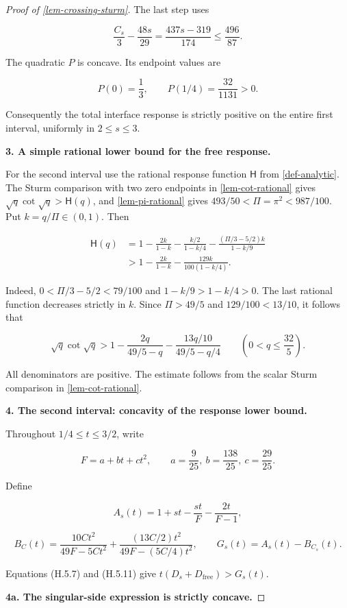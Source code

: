 \documentclass[11pt,a4paper]{article}
\theoremstyle{proofmanuscript}
\begin{document}
\begin{proof}[Proof of \ref{lem-crossing-sturm}]
The last step uses

\[
\frac{C_s}{3}-\frac{48s}{29}
=\frac{437s-319}{174}\le\frac{496}{87}.
\]

The quadratic \(P\) is concave. Its endpoint values are

\[
P(0)=\frac13,\qquad P(1/4)=\frac{32}{1131}>0.
\]

Consequently the total interface response is strictly positive on the entire first interval, uniformly in \(2\le s\le3\).

\textbf{3. A simple rational lower bound for the free response.}

For the second interval use the rational response function \(\mathsf H\) from \ref{def-analytic}. The Sturm comparison with two zero endpoints in \ref{lem-cot-rational} gives \(\sqrt q\cot\sqrt q>\mathsf H(q)\), and \ref{lem-pi-rational} gives \(493/50<\Pi=\pi^2<987/100\). Put \(k=q/\Pi\in(0,1)\). Then

\[
\begin{aligned}
\mathsf H(q)
&=1-\frac{2k}{1-k}-\frac{k/2}{1-k/4}
-\frac{(\Pi/3-5/2)k}{1-k/9}\\
&>1-\frac{2k}{1-k}-\frac{129k}{100(1-k/4)}.
\end{aligned}
\]

Indeed, \(0<\Pi/3-5/2<79/100\) and \(1-k/9>1-k/4>0\). The last rational function decreases strictly in \(k\). Since \(\Pi>49/5\) and \(129/100<13/10\), it follows that

\[
\sqrt q\cot\sqrt q>
1-\frac{2q}{49/5-q}-\frac{13q/10}{49/5-q/4}
\qquad\left(0<q\le\frac{32}{5}\right).
\tag{H.5.11}
\]

All denominators are positive. The estimate follows from the scalar Sturm comparison in \ref{lem-cot-rational}.

\textbf{4. The second interval: concavity of the response lower bound.}

Throughout \(1/4\le t\le3/2\), write

\[
F=a+bt+ct^2,\qquad a=\frac9{25},\ b=\frac{138}{25},\ c=\frac{29}{25}.
\]

Define

\[
A_s(t)=1+s t-\frac{s t}{F}-\frac{2t}{F-1},
\]

\[
B_C(t)=\frac{10C t^2}{49F-5Ct^2}
+\frac{(13C/2)t^2}{49F-(5C/4)t^2},
\qquad G_s(t)=A_s(t)-B_{C_s}(t).
\tag{H.5.12}
\]

Equations (H.5.7) and (H.5.11) give \(t(D_s+D_{\mathrm{free}})>G_s(t)\).

\textbf{4a. The singular-side expression is strictly concave.}


\end{proof}
\end{document}
